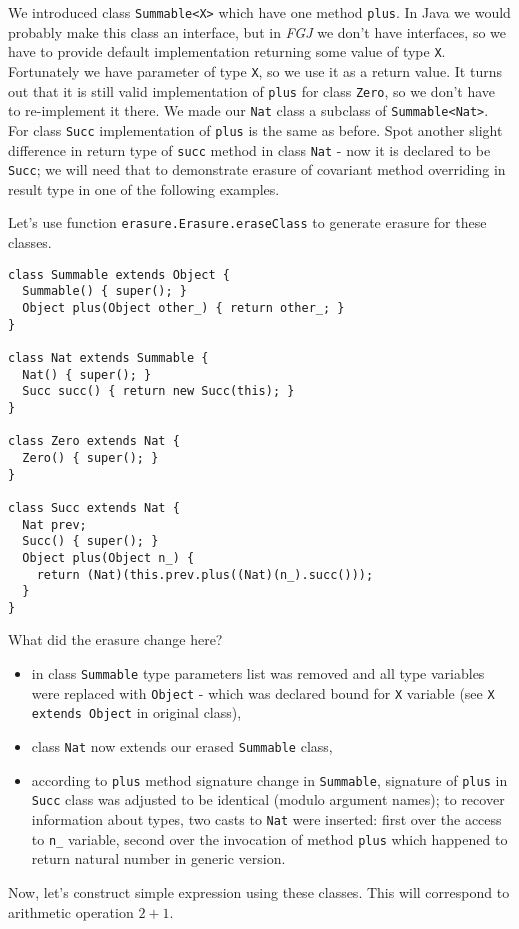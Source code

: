 \documentclass{article}[12pt]
\begin{document}
We introduced class \texttt{Summable<X>} which have one method \texttt{plus}. In Java we would probably make this class an interface, but in \emph{FGJ} we don't have interfaces, so we have to provide default implementation returning some value of type \texttt{X}. Fortunately we have parameter of type \texttt{X}, so we use it as a return value. It turns out that it is still valid implementation of \texttt{plus} for class \texttt{Zero}, so we don't have to re-implement it there. We made our \texttt{Nat} class a subclass of \texttt{Summable<Nat>}. For class \texttt{Succ} implementation of \texttt{plus} is the same as before. Spot another slight difference in return type of \texttt{succ} method in class \texttt{Nat} - now it is declared to be \texttt{Succ}; we will need that to demonstrate erasure of covariant method overriding in result type in one of the following examples.

Let's use function \texttt{erasure.Erasure.eraseClass} to generate erasure for these classes.

\begin{verbatim}
class Summable extends Object {
  Summable() { super(); }
  Object plus(Object other_) { return other_; }
}

class Nat extends Summable {
  Nat() { super(); }
  Succ succ() { return new Succ(this); }
}

class Zero extends Nat { 
  Zero() { super(); }
}

class Succ extends Nat {
  Nat prev;
  Succ() { super(); }
  Object plus(Object n_) {
    return (Nat)(this.prev.plus((Nat)(n_).succ())); 
  }
}
\end{verbatim}
What did the erasure change here?

\begin{itemize}
\item in class \texttt{Summable} type parameters list was removed and all type variables were replaced with \texttt{Object} - which was declared bound for \texttt{X} variable (see \texttt{X extends Object} in original class),
\item class \texttt{Nat} now extends our erased \texttt{Summable} class,
\item according to \texttt{plus} method signature change in \texttt{Summable}, signature of \texttt{plus} in \texttt{Succ} class was adjusted to be identical (modulo argument names); to recover information about types, two casts to \texttt{Nat} were inserted: first over the access to \texttt{n\_} variable, second over the invocation of method \texttt{plus} which happened to return natural number in generic version.
\end{itemize}
Now, let's construct simple expression using these classes. This will correspond to arithmetic operation $2 + 1$.
\end{document}
